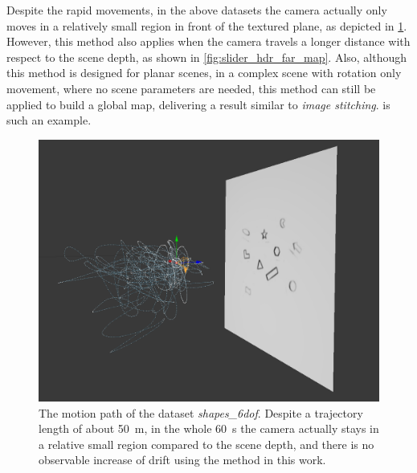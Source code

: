   Despite the rapid movements, in the above datasets the camera
  actually only moves in a relatively small region in front of the
  textured plane, as depicted in \cref{fig:shapes_6dof_path}. However,
  this method also applies when the camera travels a longer distance with
  respect to the scene depth, as shown in
  \cref{fig:slider_hdr_far_map}. Also, although this method is
  designed for planar scenes, in a complex scene with rotation only
  movement, where no scene parameters are needed, this method can
  still be applied to build a global map, delivering a result similar
  to \textit{image stitching}.  is such
  an example.
  \begin{figure}[h]
    \centering
    \includegraphics[width=\textwidth]{images/shapes_6dof_path.png}
    \caption{The motion path of the dataset
      \textit{shapes\_6dof}. Despite a trajectory length of about
      \SI{50}{\meter}, in the whole \SI{60}{\second} the camera
      actually stays in a relative small region compared to the scene
      depth, and there is no observable increase of drift using the
      method in this work.}
    \label{fig:shapes_6dof_path}
  \end{figure}
